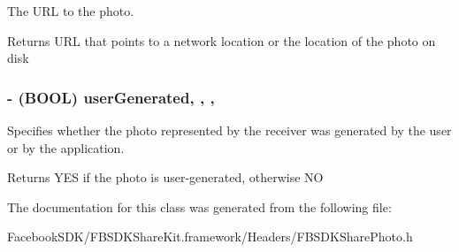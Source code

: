 The U\-R\-L to the photo. \begin{DoxyReturn}{Returns}
U\-R\-L that points to a network location or the location of the photo on disk 
\end{DoxyReturn}
\hypertarget{interface_f_b_s_d_k_share_photo_aaa348d2490f0f01361054cf06af7fc4a}{
\subsubsection[{user\-Generated}]{\setlength{\rightskip}{0pt plus 5cm}-\/ (B\-O\-O\-L) user\-Generated\hspace{0.3cm}{\ttfamily [read]}, {\ttfamily [write]}, {\ttfamily [nonatomic]}, {\ttfamily [assign]}}}\label{interface_f_b_s_d_k_share_photo_aaa348d2490f0f01361054cf06af7fc4a}
Specifies whether the photo represented by the receiver was generated by the user or by the application. \begin{DoxyReturn}{Returns}
Y\-E\-S if the photo is user-\/generated, otherwise N\-O 
\end{DoxyReturn}


The documentation for this class was generated from the following file\-:\begin{DoxyCompactItemize}
\item 
Facebook\-S\-D\-K/\-F\-B\-S\-D\-K\-Share\-Kit.\-framework/\-Headers/F\-B\-S\-D\-K\-Share\-Photo.\-h\end{DoxyCompactItemize}
